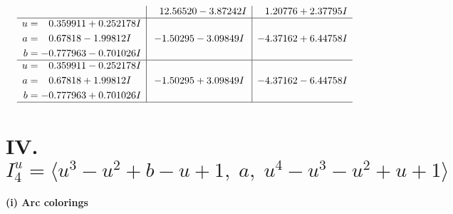 \documentclass[1p]{elsarticle_modified}
\theoremstyle{definition}
\begin{document}
$$\begin{array}{c|c|c}
 & \phantom{-}12.56520 - 3.87242 I & \phantom{-}1.20776 + 2.37795 I \\ \hline\begin{aligned}
u &= \phantom{-}0.359911 + 0.252178 I \\
a &= \phantom{-}0.67818 - 1.99812 I \\
b &= -0.777963 - 0.701026 I\end{aligned}
 & -1.50295 - 3.09849 I & -4.37162 + 6.44758 I \\ \hline\begin{aligned}
u &= \phantom{-}0.359911 - 0.252178 I \\
a &= \phantom{-}0.67818 + 1.99812 I \\
b &= -0.777963 + 0.701026 I\end{aligned}
 & -1.50295 + 3.09849 I & -4.37162 - 6.44758 I\\
 \hline 
 \end{array}$$\newpage\newpage\renewcommand{\arraystretch}{1}
\centering \section*{IV. $I^u_{4}= \langle u^3- u^2+b- u+1,\;a,\;u^4- u^3- u^2+u+1 \rangle$}
\flushleft \textbf{(i) Arc colorings}\\
\end{document}
